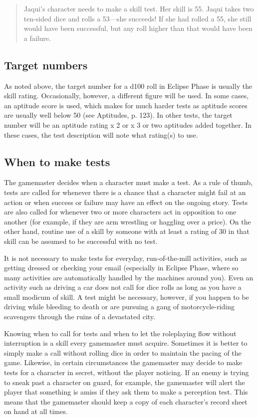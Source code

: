 \begin{quotation}
  Jaqui's character needs to make a skill test. Her skill is 55. Jaqui
  takes two ten-sided dice and rolls a 53—she succeeds! If she had
  rolled a 55, she still would have been successful, but any roll
  higher than that would have been a failure.
\end{quotation}

\subsection{Target numbers}
\label{sec:target-numbers}

As noted above, the target number for a d100 roll in Eclipse Phase is
usually the skill rating. Occasionally, however, a different figure
will be used. In some cases, an aptitude score is used, which makes
for much harder tests as aptitude scores are usually well below 50
(see Aptitudes, p. 123). In other tests, the target number will be an
aptitude rating x 2 or x 3 or two aptitudes added together. In these
cases, the test description will note what rating(s) to use.

\subsection{When to make tests}
\label{sec:when-make-tests}

The gamemaster decides when a character must make a test. As a rule of
thumb, tests are called for whenever there is a chance that a
character might fail at an action or when success or failure may have
an effect on the ongoing story. Tests are also called for whenever two
or more characters act in opposition to one another (for example, if
they are arm wrestling or haggling over a price). On the other hand,
routine use of a skill by someone with at least a rating of 30 in that
skill can be assumed to be successful with no test.

It is not necessary to make tests for everyday, run-of-the-mill
activities, such as getting dressed or checking your email (especially
in Eclipse Phase, where so many activities are automatically handled
by the machines around you). Even an activity such as driving a car
does not call for dice rolls as long as you have a small modicum of
skill. A test might be necessary, however, if you happen to be driving
while bleeding to death or are pursuing a gang of motorcycle-riding
scavengers through the ruins of a devastated city.

Knowing when to call for tests and when to let the roleplaying flow
without interruption is a skill every gamemaster must
acquire. Sometimes it is better to simply make a call without rolling
dice in order to maintain the pacing of the game. Likewise, in certain
circumstances the gamemaster may decide to make tests for a character
in secret, without the player noticing. If an enemy is trying to sneak
past a character on guard, for example, the gamemaster will alert the
player that something is amiss if they ask them to make a perception
test. This means that the gamemaster should keep a copy of each
character's record sheet on hand at all times.


